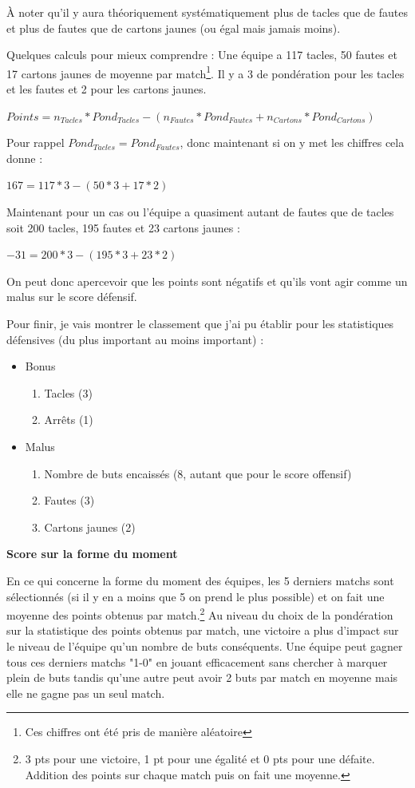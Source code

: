 \documentclass[a4paper,14pt]{extarticle}
\begin{document}
{À noter qu'il y aura théoriquement systématiquement plus de tacles que de fautes et plus de fautes que de cartons jaunes (ou égal mais jamais moins).

Quelques calculs pour mieux comprendre :
Une équipe a 117 tacles, 50 fautes et 17 cartons jaunes de moyenne par match\footnote{Ces chiffres ont été pris de manière aléatoire}. Il y a 3 de pondération pour les tacles et les fautes et 2 pour les cartons jaunes.

$Points = n_{Tacles} * Pond_{Tacles} - (n_{Fautes} * Pond_{Fautes} + n_{Cartons} * Pond_{Cartons})$ 


Pour rappel $Pond_{Tacles}=Pond_{Fautes}$, donc maintenant si on y met les chiffres cela donne : 

$167 = 117 * 3 - (50 * 3 + 17 * 2)$

Maintenant pour un cas ou l'équipe a quasiment autant de fautes que de tacles soit 200 tacles, 195 fautes et 23 cartons jaunes : 

$-31 = 200 * 3 - (195 * 3 + 23 * 2)$

On peut donc apercevoir que les points sont négatifs et qu'ils vont agir comme un malus sur le score défensif.

Pour finir, je vais montrer le classement que j'ai pu établir pour les statistiques défensives (du plus important au moins important) :
\begin{itemize}
    \item Bonus
    \begin{enumerate}
        \item Tacles (3)
        \item Arrêts (1)
    \end{enumerate}
    \item Malus
    \begin{enumerate}
        \item Nombre de buts encaissés (8, autant que pour le score offensif)
        \item Fautes (3)
        \item Cartons jaunes (2)
    \end{enumerate}
\end{itemize}

\newpage

\noindent\textbf{Score sur la forme du moment}

En ce qui concerne la forme du moment des équipes, les 5 derniers matchs sont sélectionnés (si il y en a moins que 5 on prend le plus possible) et on fait une moyenne des points obtenus par match.\footnote{3 pts pour une victoire, 1 pt pour une égalité et 0 pts pour une défaite. Addition des points sur chaque match puis on fait une moyenne.} 
Au niveau du choix de la pondération sur la statistique des points obtenus par match, une victoire a plus d'impact sur le niveau de l'équipe qu'un nombre de buts conséquents. Une équipe peut gagner tous ces derniers matchs "1-0" en jouant efficacement sans chercher à marquer plein de buts tandis qu'une autre peut avoir 2 buts par match en moyenne mais elle ne gagne pas un seul match.

}
\end{document}

